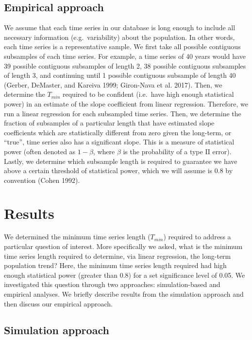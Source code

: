 \documentclass[12pt,]{article}
\begin{document}
\subsection{Empirical approach}\label{empirical-approach}

We assume that each time series in our database is long enough to
include all necessary information (e.g.~variability) about the
population. In other words, each time series is a representative sample.
We first take all possible contiguous subsamples of each time series.
For example, a time series of 40 years would have 39 possible contiguous
subsamples of length 2, 38 possible contiguous subsamples of length 3,
and continuing until 1 possible contiguous subsample of length 40
(Gerber, DeMaster, and Kareiva 1999; Giron-Nava et al. 2017). Then, we
determine the \(T_{min}\) required to be confident (i.e.~have high
enough statistical power) in an estimate of the slope coefficient from
linear regression. Therefore, we run a linear regression for each
subsampled time series. Then, we determine the fraction of subsamples of
a particular length that have estimated slope coefficients which are
statistically different from zero given the long-term, or ``true'', time
series also has a significant slope. This is a measure of statistical
power (often denoted as \(1 - \beta\), where \(\beta\) is the
probability of a type II error). Lastly, we determine which subsample
length is required to guarantee we have above a certain threshold of
statistical power, which we will assume is 0.8 by convention (Cohen
1992).

\section{Results}\label{results}

We determined the minimum time series length (\(T_{min}\)) required to
address a particular question of interest. More specifically we asked,
what is the minimum time series length required to determine, via linear
regression, the long-term population trend? Here, the minimum time
series length required had high enough statistical power (greater than
0.8) for a set significance level of 0.05. We investigated this question
through two approaches: simulation-based and empirical analyses. We
briefly describe results from the simulation approach and then discuss
our empirical approach.

\subsection{Simulation approach}\label{simulation-approach-1}
\end{document}
